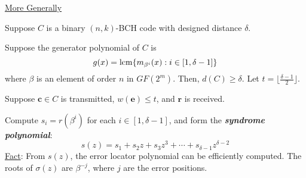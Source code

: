 \underline{More Generally}

Suppose $ C $ is a binary $ (n,k) $-BCH code with designed distance $ \delta $.

Suppose the generator polynomial of $ C $ is
\[ g(x)=\operatorname{lcm} \{m_{\beta^i}(x):i\in[1,\delta-1]\} \]
where $ \beta $ is an element of order $ n $ in $ GF(2^m) $. Then, $ d(C)\geqslant \delta $.
Let $ t=\lfloor \frac{\delta-1}{2} \rfloor $.

Suppose $ \bm{c}\in C $ is transmitted, $ w(\bm{e})\leqslant t $, and $ \bm{r} $
is received.

Compute $ s_i=r(\beta^i) $ for each $ i\in[1,\delta-1] $, and form the
\textbf{\emph{syndrome polynomial}}:
\[ s(z)=s_1+s_2z+s_3z^3+\cdots+s_{\delta-1}z^{\delta-2} \]
\underline{Fact}: From $ s(z) $, the error locator polynomial
can be efficiently computed. The roots of $ \sigma(z) $
are $ \beta^{-j} $, where $ j $ are the error positions.
